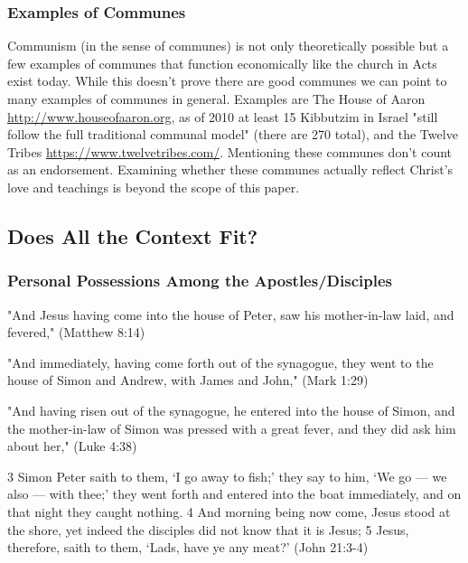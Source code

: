 \documentclass[11pt]{article}
\begin{document}
\subsubsection{Examples of Communes}
Communism (in the sense of communes) is not only theoretically possible but a few examples of communes that function economically like the church in Acts exist today. While this doesn't prove there are good communes we can point to many examples of communes in general. Examples are The House of Aaron \url{http://www.houseofaaron.org}, as of 2010 at least 15 Kibbutzim in Israel "still follow the full traditional communal model" (there are 270 total),\cite{kibbutz} and the Twelve Tribes \url{https://www.twelvetribes.com/}. Mentioning these communes don't count as an endorsement. Examining whether these communes actually reflect Christ's love and teachings is beyond the scope of this paper. 



\subsection{Does All the Context Fit?}
\subsubsection{Personal Possessions Among the Apostles/Disciples}

"And Jesus having come into the house of Peter, saw his mother-in-law laid, and fevered," (Matthew 8:14)

"And immediately, having come forth out of the synagogue, they went to the house of Simon and Andrew, with James and John," (Mark 1:29)

"And having risen out of the synagogue, he entered into the house of Simon, and the mother-in-law of Simon was pressed with a great fever, and they did ask him about her," (Luke 4:38)

 3 Simon Peter saith to them, ‘I go away to fish;’ they say to him, ‘We go — we also — with thee;’ they went forth and entered into the boat immediately, and on that night they caught nothing.
4 And morning being now come, Jesus stood at the shore, yet indeed the disciples did not know that it is Jesus; 5 Jesus, therefore, saith to them, ‘Lads, have ye any meat?’ 
(John 21:3-4)
\end{document}
